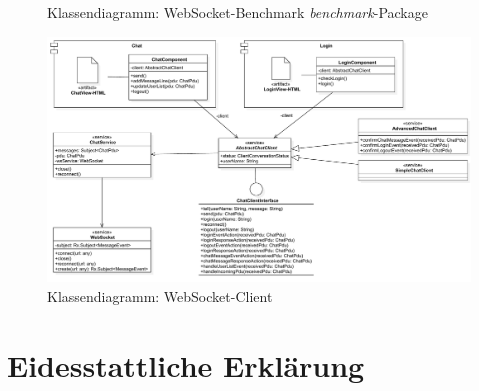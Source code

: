 \documentclass[11pt,a4paper,titlepage]{scrartcl}
\numberwithin{equation}{section}
\begin{document}
\begin{landscape}
\begin{figure}[ht]
\begin{center}
		\caption[]{Klassendiagramm: WebSocket-Benchmark \textit{benchmark}-Package}
		\label{fig:kdbench}
	\end{center}
\end{figure}
\begin{figure}[ht] 
	\begin{center}
		\includegraphics[scale=0.7]{img/ClientNew.pdf}
		\caption[]{Klassendiagramm: WebSocket-Client}
		\label{fig:kdClient}
	\end{center}
\end{figure}
\end{landscape}

\section*{Eidesstattliche Erklärung}
\end{document}

